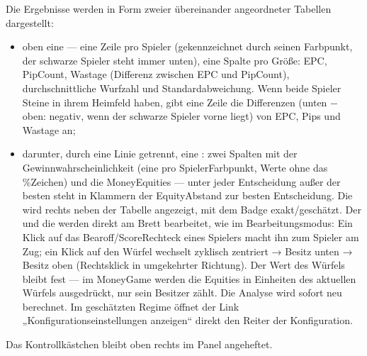 \documentclass[letterpaper,10pt,german]{sphinxmanual}
\begin{document}
\sphinxAtStartPar
Die Ergebnisse werden in Form zweier übereinander angeordneter Tabellen dargestellt:
\begin{itemize}
\item {} 
\sphinxAtStartPar
oben eine  — eine Zeile pro Spieler (gekennzeichnet durch seinen Farbpunkt, der schwarze Spieler steht immer unten), eine Spalte pro Größe: EPC, Pip\sphinxhyphen{}Count, Wastage (Differenz zwischen EPC und Pip\sphinxhyphen{}Count), durchschnittliche Wurfzahl und Standardabweichung. Wenn beide Spieler Steine in ihrem Heimfeld haben, gibt eine \sphinxhyphen{}Zeile die  Differenzen (unten − oben: negativ, wenn der schwarze Spieler vorne liegt) von EPC, Pips und Wastage an;

\item {} 
\sphinxAtStartPar
darunter, durch eine Linie getrennt, eine : zwei Spalten mit der Gewinnwahrscheinlichkeit (eine pro Spieler\sphinxhyphen{}Farbpunkt, Werte ohne das \%\sphinxhyphen{}Zeichen) und die Money\sphinxhyphen{}Equities — unter jeder Entscheidung außer der besten steht in Klammern der Equity\sphinxhyphen{}Abstand zur besten Entscheidung. Die  wird rechts neben der Tabelle angezeigt, mit dem Badge exakt/geschätzt. Der  und die  werden direkt am Brett bearbeitet, wie im Bearbeitungsmodus: Ein Klick auf das Bearoff\sphinxhyphen{}/Score\sphinxhyphen{}Rechteck eines Spielers macht ihn zum Spieler am Zug; ein Klick auf den Würfel wechselt zyklisch zentriert → Besitz unten → Besitz oben (Rechtsklick in umgekehrter Richtung). Der Wert des Würfels bleibt fest — im Money\sphinxhyphen{}Game werden die Equities in Einheiten des aktuellen Würfels ausgedrückt, nur sein Besitzer zählt. Die Analyse wird sofort neu berechnet. Im geschätzten Regime öffnet der Link „Konfigurationseinstellungen anzeigen“ direkt den Reiter  der Konfiguration.

\end{itemize}

\sphinxAtStartPar
Das Kontrollkästchen  bleibt oben rechts im Panel angeheftet.
\end{document}
